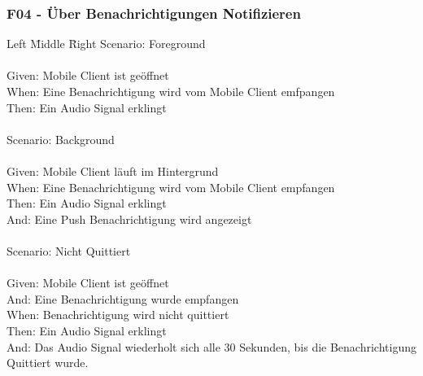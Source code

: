 \subsubsection*{F04 - Über Benachrichtigungen Notifizieren}
\begin{tabbing}
    Left \= Middle \= Right \kill
    Scenario: \> \>  Foreground\\ \\
    Given: \> \>   Mobile Client ist geöffnet\\
    When: \> \>    Eine Benachrichtigung wird vom Mobile Client emfpangen\\
    Then: \> \>    Ein Audio Signal erklingt\\
    \\
    Scenario: \> \>  Background\\ \\
    Given: \> \>   Mobile Client läuft im Hintergrund\\
    When: \> \>    Eine Benachrichtigung wird vom Mobile Client empfangen\\
    Then: \> \>    Ein Audio Signal erklingt\\
    And: \> \>     Eine Push Benachrichtigung wird angezeigt\\
    \\
    Scenario: \> \>  Nicht Quittiert\\ \\
    Given: \> \>   Mobile Client ist geöffnet\\
    And: \> \>     Eine Benachrichtigung wurde empfangen\\
    When: \> \>    Benachrichtigung wird nicht quittiert\\
    Then: \> \>    Ein Audio Signal erklingt\\
    And: \> \>     Das Audio Signal wiederholt sich alle 30 Sekunden, bis die Benachrichtigung Quittiert wurde.\\
\end{tabbing}

\clearpage

